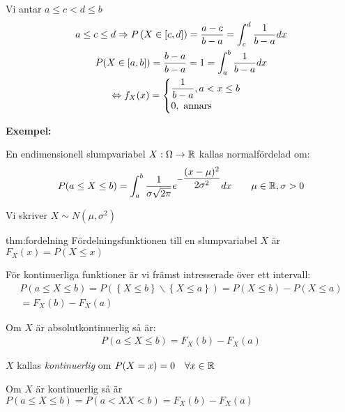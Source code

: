 \noindent Vi antar $a\leq c<d\leq b$
\begin{equation*}
  \begin{gathered}
    a\leq c\leq d \Rightarrow P\left(X\in[c,d]\right)=\dfrac{a-c}{b-a}=\int_{c}^{d}\dfrac{1}{b-a}dx\\
  P(X\in[a,b])=\dfrac{b-a}{b-a}=1=\int_{a}^{b}\dfrac{1}{b-a}dx\\
  \Leftrightarrow f_X(x)=
    \begin{cases}
      \dfrac{1}{b-a}, a<x\leq b\\
      0,\text{ annars}
    \end{cases}
  \end{gathered}
\end{equation*}
\par\bigskip
\noindent\textbf{Exempel:}\par
\noindent En endimensionell slumpvariabel $X:\Omega\to\mathbb{R}$ kallas normalfördelad om:
\begin{equation*}
  \begin{gathered}
    P(a\leq X\leq b) = \int_{a}^{b}\dfrac{1}{\sigma\sqrt{2\pi}}e^{-\dfrac{(x-\mu)^2}{2\sigma^2}}dx\qquad \mu\in\mathbb{R},\sigma>0
  \end{gathered}
\end{equation*}\par
\noindent Vi skriver $X\sim N(\mu,\sigma^2)$
\newpage
\begin{theo}[Fördelningsfunktion]{thm:fordelning}
  Fördelningsfunktionen till en slumpvariabel $X$ är $F_X(x)=P(X\leq x)$\par
  \noindent För kontinuerliga funktioner är vi främst intresserade över ett intervall:
  \begin{equation*}
    \begin{gathered}
      P(a\leq X\leq b) = P(\left\{X\leq b\right\}\backslash\left\{X\leq a\right\}) = P(X\leq b)-P(X\leq a)\\
        = F_X(b)-F_X(a)
    \end{gathered}
  \end{equation*}\par
  \noindent Om $X$ är absolutkontinuerlig så är:
  \begin{equation*}
    \begin{gathered}
      P(a\leq X\leq b) = F_X(b)-F_X(a)
    \end{gathered}
  \end{equation*}
  \par\bigskip
  \noindent $X$ kallas \textit{kontinuerlig} om $P(X=x)=0\quad\forall x\in\mathbb{R}$\par
  \noindent Om $X$ är kontinuerlig så är $P(a\leq X\leq b) = P(a<XX<b) = F_X(b)-F_X(a)$
\end{theo}
